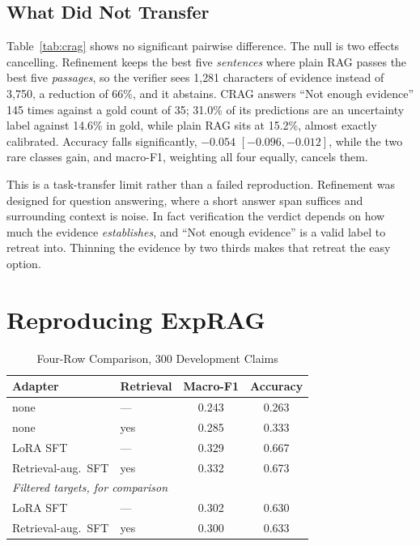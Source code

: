 \documentclass[journal]{IEEEtran}
\begin{document}
\subsection{What Did Not Transfer}
Table~\ref{tab:crag} shows no significant pairwise difference. The null is two
effects cancelling. Refinement keeps the best five \emph{sentences} where plain
RAG passes the best five \emph{passages}, so the verifier sees 1{,}281
characters of evidence instead of 3{,}750, a reduction of 66\%, and it abstains.
CRAG answers ``Not enough evidence'' 145 times against a gold count of 35;
31.0\% of its predictions are an uncertainty label against 14.6\% in gold, while
plain RAG sits at 15.2\%, almost exactly calibrated. Accuracy falls
significantly, $-0.054$ $[-0.096, -0.012]$, while the two rare classes gain, and
macro-F1, weighting all four equally, cancels them.

This is a task-transfer limit rather than a failed reproduction. Refinement was
designed for question answering, where a short answer span suffices and
surrounding context is noise. In fact verification the verdict depends on how
much the evidence \emph{establishes}, and ``Not enough evidence'' is a valid
label to retreat into. Thinning the evidence by two thirds makes that retreat
the easy option.

\section{Reproducing ExpRAG}
\label{sec:exprag}

\begin{table}[!t]
\caption{Four-Row Comparison, 300 Development Claims}
\label{tab:exprag}
\centering
\begin{tabular}{llcc}
\toprule
Adapter & Retrieval & Macro-F1 & Accuracy \\
\midrule
none                & ---  & 0.243 & 0.263 \\
none                & yes  & 0.285 & 0.333 \\
LoRA SFT            & ---  & 0.329 & 0.667 \\
Retrieval-aug.\ SFT & yes  & 0.332 & 0.673 \\
\midrule
\multicolumn{4}{l}{\emph{Filtered targets, for comparison}}\\
LoRA SFT            & ---  & 0.302 & 0.630 \\
Retrieval-aug.\ SFT & yes  & 0.300 & 0.633 \\
\bottomrule
\end{tabular}
\end{table}
\end{document}
